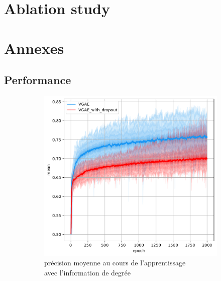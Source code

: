 \documentclass{article}
\begin{document}
\section{Ablation study}

\section{Annexes}

\subsection{Performance}
\begin{figure}[H]
    \centering
    \captionsetup{justification=centering}
    \begin{subfigure}{0.45\textwidth}
      \includegraphics[width=\textwidth]{graphics/APs_degree_dropout_cinf.svg.pdf}
      \centering
      \caption{précision moyenne au cours de l'apprentissage\\ avec l'information de degrée}
    \end{subfigure}
    \begin{subfigure}{0.45\textwidth}

\end{subfigure}
\end{figure}
\end{document}
